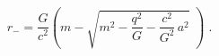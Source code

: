 \begin{equation} \label{eqp3a} 
r_{-} = \frac{G}{c^2} \left( m - \sqrt{m^2 - \frac{q^2}{G}  -
\frac{c^2}{G^2} \, a^2} \,\, \right) \; .
\end{equation} 
